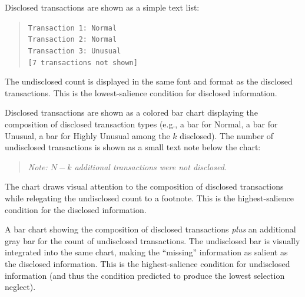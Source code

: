 \documentclass[12pt]{article}
\theoremstyle{definition}
\begin{document}
\begin{description}[style=nextline]

\item[\textbf{Condition A: List}]
Disclosed transactions are shown as a simple text list:
\begin{quote}
\texttt{Transaction 1: Normal} \\
\texttt{Transaction 2: Normal} \\
\texttt{Transaction 3: Unusual} \\
\texttt{[7 transactions not shown]}
\end{quote}
The undisclosed count is displayed in the same font and format as the disclosed transactions. This is the lowest-salience condition for disclosed information.

\item[\textbf{Condition B: Chart-Disclosed}]
Disclosed transactions are shown as a colored bar chart displaying the composition of disclosed transaction types (e.g., a bar for Normal, a bar for Unusual, a bar for Highly Unusual among the $k$ disclosed). The number of undisclosed transactions is shown as a small text note below the chart:
\begin{quote}
\textit{Note: $N - k$ additional transactions were not disclosed.}
\end{quote}
The chart draws visual attention to the composition of disclosed transactions while relegating the undisclosed count to a footnote. This is the highest-salience condition for the disclosed information.

\item[\textbf{Condition C: Chart-Full}]
A bar chart showing the composition of disclosed transactions \emph{plus} an additional gray bar for the count of undisclosed transactions. The undisclosed bar is visually integrated into the same chart, making the ``missing'' information as salient as the disclosed information. This is the highest-salience condition for undisclosed information (and thus the condition predicted to produce the lowest selection neglect).
\end{description}
\end{document}
